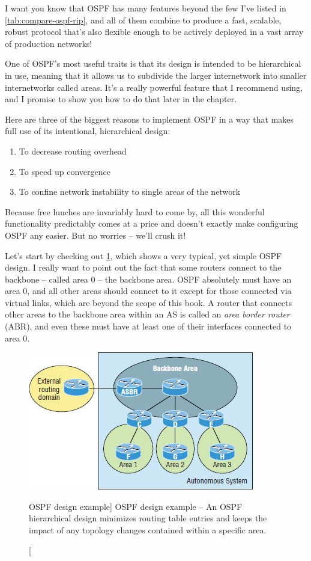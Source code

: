 I want you know that OSPF has many features beyond the few I've listed in \cref{tab:compare-ospf-rip},
and all of them combine to produce a fast, scalable, robust protocol that's also flexible enough to be actively deployed in a vast array of production networks!

One of OSPF's most useful traits is that its design is intended to be
hierarchical in use, meaning that it allows us to subdivide the larger
internetwork into smaller internetworks
\protect\hypertarget{c18.xhtmlux5cux23Page_748}{}{}called areas. It's a
really powerful feature that I recommend using, and I promise to show
you how to do that later in the chapter.

Here are three of the biggest reasons to implement OSPF in a way that
makes full use of its intentional, hierarchical design:

\begin{enumerate}
\item
  To decrease routing overhead
\item
  To speed up convergence
\item
  To confine network instability to single areas of the network
\end{enumerate}

Because free lunches are invariably hard to come by, all this wonderful
functionality predictably comes at a price and doesn't exactly make
configuring OSPF any easier. But no worries -- we'll crush it!

Let's start by checking out \cref{fig:ospf-design-example}, which shows a very typical, yet simple OSPF design.
I really want to point out the fact that some routers connect to the backbone -- called area 0 -- the
backbone area. OSPF absolutely must have an area 0, and all other areas
should connect to it except for those connected via virtual links, which
are beyond the scope of this book. A router that connects other areas to
the backbone area within an AS is called an \emph{area border router}
(ABR), and even these must have at least one of their interfaces
connected to area 0.

\begin{figure}
   \centering
   \includegraphics[width=.6\textwidth]{images/c18f001.jpg}
   \caption
      [OSPF design example]
      {OSPF design example -- An OSPF hierarchical design minimizes routing table entries and keeps the impact of any topology changes contained within a specific area.}
   \label{fig:ospf-design-example}
\end{figure}

